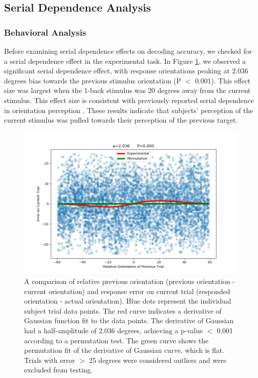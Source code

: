\documentclass[../main.tex]{subfiles}
\begin{document}
\subsection*{Serial Dependence Analysis}
\subsubsection*{Behavioral Analysis}
Before examining serial dependence effects on decoding accuracy, we checked for a serial dependence effect in the experimental task. In Figure \ref{DoG}, we observed a significant serial dependence effect, with response orientations peaking at 2.036 degrees bias towards the previous stimulus orientation (P $<$ 0.001). This effect size was largest when the 1-back stimulus was 20 degrees away from the current stimulus. This effect size is consistent with previously reported serial dependence in orientation perception \citep{FRITSCHE2017590,Manassi}. These results indicate that subjects' perception of the current stimulus was pulled towards their perception of the previous target.

\begin{figure}
    \centering
    \includegraphics[scale=0.7]{figures/results/DoG_plot_v2.png}
    \caption{A comparison of relative previous orientation (previous orientation - current orientation) and response error on current trial (responded orientation - actual orientation). Blue dots represent the individual subject trial data points. The red curve indicates a derivative of Gaussian function fit to the data points. The derivative of Gaussian had a half-amplitude of 2.036 degrees, achieving a p-value $<$ 0.001 according to a permutation test. The green curve shows the permutation fit of the derivative of Gaussian curve, which is flat. Trials with error $>$ 25 degrees were considered outliers and were excluded from testing. }
    \label{DoG}
\end{figure}
\end{document}
